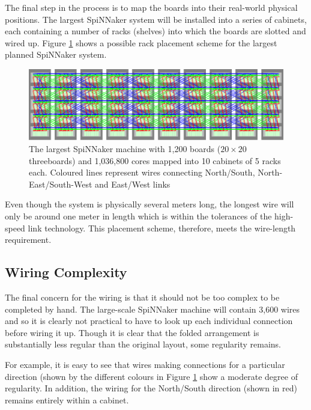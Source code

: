 			\label{sec:mapping-spinnaker-to-cabinets}
			
			The final step in the process is to map the boards into their real-world
			physical positions. The largest SpiNNaker system will be installed into a
			series of cabinets, each containing a number of racks (shelves) into which
			the boards are slotted and wired up. Figure \ref{fig:spinnaker106} shows a
			possible rack placement scheme for the largest planned SpiNNaker system.
			
			\begin{figure}
				\center
				\includegraphics[width=\textwidth]{figures/spinnaker106}
				\caption[The largest SpiNNaker machine mapped into cabinets and
				racks]{The largest SpiNNaker machine with 1,200 boards ($20\times20$
				threeboards) and 1,036,800 cores mapped into 10 cabinets of 5 racks
				each.  Coloured lines represent wires connecting
				{\color{red}North/South}, {\color{green}North-East/South-West} and
				{\color{blue}East/West} links}
				\label{fig:spinnaker106}
			\end{figure}
			
			Even though the system is physically several meters long, the longest wire
			will only be around one meter in length which is within the tolerances of
			the high-speed link technology. This placement scheme, therefore, meets the
			wire-length requirement.
			
		\subsection{Wiring Complexity}
			
			The final concern for the wiring is that it should not be too complex to
			be completed by hand. The large-scale SpiNNaker machine will contain 3,600
			wires and so it is clearly not practical to have to look up each
			individual connection before wiring it up. Though it is clear that the
			folded arrangement is substantially less regular than the original layout,
			some regularity remains.
			
			For example, it is easy to see that wires making connections for a
			particular direction (shown by the different colours in Figure
			\ref{fig:spinnaker106} show a moderate degree of regularity. In addition,
			the wiring for the North/South direction (shown in red) remains entirely
			within a cabinet.
			
